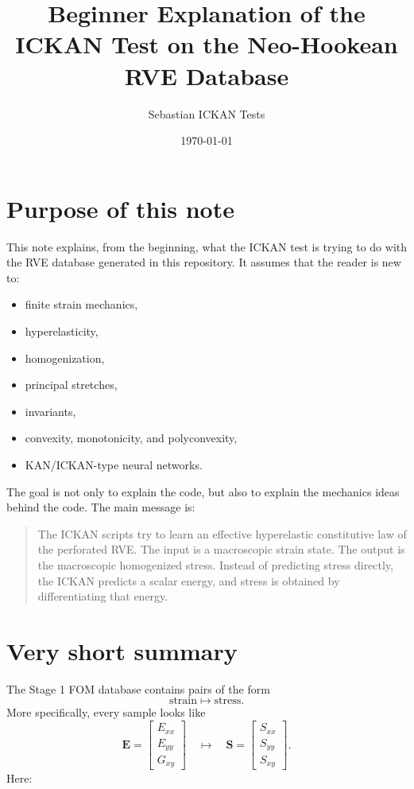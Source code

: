 \documentclass[11pt]{article}
\title{Beginner Explanation of the ICKAN Test on the Neo-Hookean RVE Database}
\author{Sebastian ICKAN Tests}
\date{\today}
\newcommand{\E}{\bm{E}}
\newcommand{\Sstress}{\bm{S}}
\begin{document}
\maketitle

\tableofcontents

\section{Purpose of this note}

This note explains, from the beginning, what the ICKAN test is trying to do with
the RVE database generated in this repository. It assumes that the reader is new
to:

\begin{itemize}[leftmargin=2em]
  \item finite strain mechanics,
  \item hyperelasticity,
  \item homogenization,
  \item principal stretches,
  \item invariants,
  \item convexity, monotonicity, and polyconvexity,
  \item KAN/ICKAN-type neural networks.
\end{itemize}

The goal is not only to explain the code, but also to explain the mechanics
ideas behind the code. The main message is:

\begin{quote}
The ICKAN scripts try to learn an effective hyperelastic constitutive law of the
perforated RVE. The input is a macroscopic strain state. The output is the
macroscopic homogenized stress. Instead of predicting stress directly, the ICKAN
predicts a scalar energy, and stress is obtained by differentiating that energy.
\end{quote}

\section{Very short summary}

The Stage 1 FOM database contains pairs of the form
\[
  \text{strain} \longmapsto \text{stress}.
\]
More specifically, every sample looks like
\[
  \E =
  \begin{bmatrix}
    E_{xx} \\
    E_{yy} \\
    G_{xy}
  \end{bmatrix}
  \quad \longmapsto \quad
  \Sstress =
  \begin{bmatrix}
    S_{xx} \\
    S_{yy} \\
    S_{xy}
  \end{bmatrix}.
\]
Here:
\end{document}
